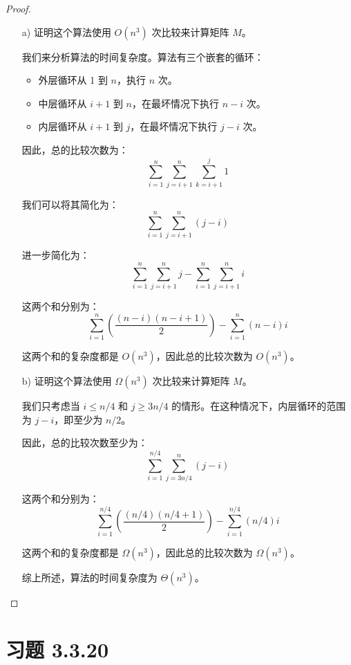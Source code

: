 \documentclass[UTF8]{report}
\theoremstyle{MyLineTheoremStyle} %
\theoremstyle{MyBlockTheoremStyle} %
\theoremstyle{MySubsubsectionStyle} %
\begin{document}
\begin{proof}
    \begin{itemize}
        \item[a)] 证明这个算法使用 \( O(n^3) \) 次比较来计算矩阵 \( M \)。

        我们来分析算法的时间复杂度。算法有三个嵌套的循环：
        \begin{itemize}
            \item 外层循环从 1 到 \( n \)，执行 \( n \) 次。
            \item 中层循环从 \( i + 1 \) 到 \( n \)，在最坏情况下执行 \( n - i \) 次。
            \item 内层循环从 \( i + 1 \) 到 \( j \)，在最坏情况下执行 \( j - i \) 次。
        \end{itemize}

        因此，总的比较次数为：
        \[
        \sum_{i=1}^{n} \sum_{j=i+1}^{n} \sum_{k=i+1}^{j} 1
        \]

        我们可以将其简化为：
        \[
        \sum_{i=1}^{n} \sum_{j=i+1}^{n} (j - i)
        \]

        进一步简化为：
        \[
        \sum_{i=1}^{n} \sum_{j=i+1}^{n} j - \sum_{i=1}^{n} \sum_{j=i+1}^{n} i
        \]

        这两个和分别为：
        \[
        \sum_{i=1}^{n} \left( \frac{(n-i)(n-i+1)}{2} \right) - \sum_{i=1}^{n} (n-i)i
        \]

        这两个和的复杂度都是 \( O(n^3) \)，因此总的比较次数为 \( O(n^3) \)。

        \item[b)] 证明这个算法使用 \( \Omega(n^3) \) 次比较来计算矩阵 \( M \)。

        我们只考虑当 \( i \leq n/4 \) 和 \( j \geq 3n/4 \) 的情形。在这种情况下，内层循环的范围为 \( j - i \)，即至少为 \( n/2 \)。

        因此，总的比较次数至少为：
        \[
        \sum_{i=1}^{n/4} \sum_{j=3n/4}^{n} (j - i)
        \]

        这两个和分别为：
        \[
        \sum_{i=1}^{n/4} \left( \frac{(n/4)(n/4+1)}{2} \right) - \sum_{i=1}^{n/4} (n/4)i
        \]

        这两个和的复杂度都是 \( \Omega(n^3) \)，因此总的比较次数为 \( \Omega(n^3) \)。

        综上所述，算法的时间复杂度为 \( \Theta(n^3) \)。
    \end{itemize}
\end{proof}

\section{习题 3.3.20}
\end{document}
